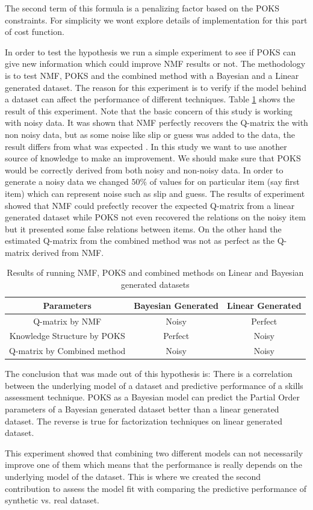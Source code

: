 The second term of this formula is a penalizing factor based on the \ac{POKS} constraints. For simplicity we wont explore details of implementation for this part of cost function. 

In order to test the hypothesis we run a simple experiment to see if POKS can give new information which could improve NMF results or not. The methodology is to test NMF, POKS and the combined method with a Bayesian and a Linear generated dataset. The reason for this experiment is to verify if the model behind a dataset can affect the performance of different techniques. Table \ref{Contribution1} shows the result of this experiment. Note that the basic concern of this study is working with noisy data. It was shown that \ac{NMF} perfectly recovers the Q-matrix the with non noisy data, but as some noise like slip or guess was added to the data, the result differs from what was expected \citep{desmarais2011conditions,desmarais2012item}. In this study we want to use another source of knowledge to make an improvement. We should make sure that \ac{POKS} would be correctly derived from both noisy and non-noisy data. In order to generate a noisy data we changed $50\%$ of values for on particular item (say first item) which can represent noise such as slip and guess. The results of experiment showed that NMF could prefectly recover the expected Q-matrix from a linear generated dataset while POKS not even recovered the relations on the noisy item but it presented some false relations between items. On the other hand the estimated Q-matrix from the combined method was not as perfect as the Q-matrix derived from NMF. 


\begin{table}
\center
\caption{Results of running NMF, POKS and combined methods on Linear and Bayesian generated datasets}
\begin{tabular}{|c|c|c|}
\hline
Parameters & Bayesian Generated & Linear Generated\\
\hline
Q-matrix by NMF & Noisy & Perfect\\
\hline
Knowledge Structure by POKS & Perfect & Noisy\\
\hline
Q-matrix by Combined method & Noisy & Noisy\\
\hline

\end{tabular}
\label{Contribution1}
\end{table}

The conclusion that was made out of this hypothesis is: There is a correlation between the underlying model of a dataset and predictive performance of a skills assessment technique. POKS as a Bayesian model can predict the Partial Order parameters of a Bayesian generated dataset better than a linear generated dataset. The reverse is true for factorization techniques on linear generated dataset. 

This experiment showed that combining two different models can not necessarily improve one of them which means that the performance is really depends on the underlying model  of the dataset. This is where we created the second contribution to assess the model fit with comparing the predictive performance of synthetic vs. real dataset.

